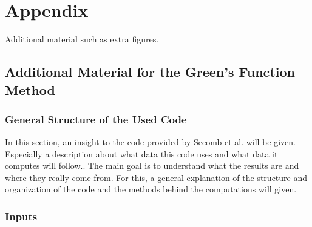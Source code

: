 
\section{Appendix}
\label{s:Appendix}

Additional material such as extra figures.

\subsection{Additional Material for the Green's Function Method}

\subsubsection{General Structure of the Used Code}
\label{GreensCode}

In this section, an insight to the code provided by Secomb et al. \cite{Secomb2004} will be given. Especially a description about what data this code uses and what data it computes will follow.. 
The main goal is to understand what the results are and where they really come from. For this, a general explanation of the structure and organization of the code and the methods behind the computations will given.

\subsubsection*{Inputs}
\label{Inputs}

